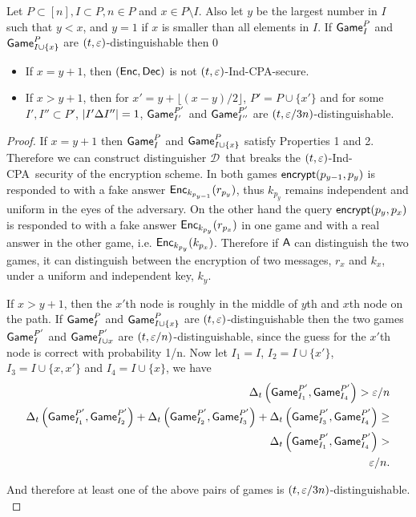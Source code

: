 \documentclass{article}
\newcommand{\tcpa}{$(t,\eps)$-Ind-CPA}
\def\A{{\sf A}}
\def\a{${\mathcal D}$}
\newcommand{\encrypt}{{\sf encrypt}}
\newcommand{\game}{{\sf Game}}
\newcommand{\dgg}[2]{\game_{#1}^{#2}}
\def\newver{1}
\begin{document}
\begin{lemma}\label{lem:single}
Let $P\subset [n], I \subset P, n\in P$ and $x\in P\setminus I$. Also let $y$ be the largest number in $I$ such that $y < x$, and $y=1$ if  $x$ is smaller than all elements in $I$. If $\dgg{I}{P}$ and $\dgg{I\cup \{x\}}{P}$ are $(t,\varepsilon)$-distinguishable then 
\if\newver0
\begin{itemize}
\item If $x=y+1$, then $({\sf Enc},{\sf Dec})$ is not \tcpa-secure.
\item If $x>y+1$, then for $x'=y+\lfloor{(x-y)/2}\rfloor$, $P'=P\cup \{x'\}$ and for some $I', I'' \subset P'$, $\left| I'\Delta I'' \right| =1$, $\dgg{I'}{P'}$ and $\dgg{I''}{P'}$ are $(t, \varepsilon/3n)$-distinguishable.
\end{itemize}
\end{lemma}

\begin{proof}
If $x=y+1$ then $\dgg{I}{P}$ and $\dgg{I\cup \{x\}}{P}$ satisfy Properties 1 and 2. Therefore we can construct distinguisher \a~that breaks  the \tcpa~security of the encryption scheme. In both games $\encrypt(p_{y-1},p_{y})$ is responded to with a fake answer ${\sf Enc}_{k_{p_{y-1}}}(r_{p_{y}})$, thus $k_{p_{y}} $ remains independent and uniform in the eyes of the adversary. On the other hand the query $\encrypt(p_{y},p_x)$ is responded to with a fake answer ${\sf Enc}_{k_{p_{y}}}(r_{p_{x}})$ in one game and with a real answer in the other game, i.e. ${\sf Enc}_{k_{p_{y}}}(k_{p_{x}})$. Therefore if $\A$ can distinguish the two games, it can distinguish between the encryption of two messages, $r_x$ and $k_x$, under a uniform and independent key, $k_y$. 

If $x>y+1$, then the $x'$th node is roughly in the middle of $y$th and $x$th node on the path. If $\dgg{I}{P}$ and $\dgg{I\cup \{x\}}{P}$ are $(t,\varepsilon)$-distinguishable then the two games  $\dgg{I}{P'}$ and $\dgg{I\cup {x}}{P'}$ are $(t,\varepsilon/n)$-distinguishable, since the guess for the $x'$th node is correct with probability 1/n.
Now let $I_1=I$, $I_2=I\cup \{x'\}$, $I_3=I\cup \{x,x'\}$ and $I_4=I\cup \{x\}$, we have
\begin{align}
\dElta{\dgg{I_1}{P'}, \dgg{I_4}{P'}}  > \eps/n \\
\dElta{\dgg{I_1}{P'}, \dgg{I_2}{P'}} + \dElta{\dgg{I_2}{P'}, \dgg{I_3}{P'}} + \dElta{\dgg{I_3}{P'}, \dgg{I_4}{P'}}  \geq \nonumber\\ \dElta{\dgg{I_1}{P'}, \dgg{I_4}{P'}}  > \nonumber \\ \eps/n.
\end{align}

And therefore at least one of the above pairs of games is $(t,\varepsilon/3n)$-distinguishable. \\
\end{proof}
\end{document}
